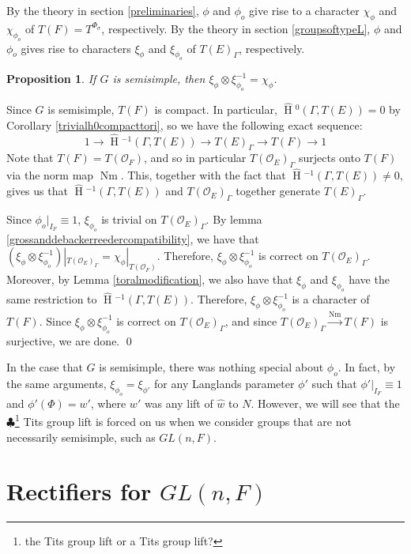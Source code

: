 \documentclass[11pt]{amsart}
\theoremstyle{plain}
\newtheorem{proposition}[theorem]{Proposition}
\newcommand{\MAxxx}[1]{$\clubsuit$\footnote{#1}}
\newcommand{\HT}[1]{\hat{\HH}{}^{#1}}
\theoremstyle{definition}
\DeclareMathOperator{\HH}{H}
\DeclareMathOperator{\Nm}{Nm}
\begin{document}
By the theory in section \ref{preliminaries}, $\phi$ and $\phi_o$ give
rise to a character $\chi_{\phi}$ and $\chi_{\phi_o}$ of
$T(F) = T^{\Phi_{\sigma}}$, respectively.  By the theory in section
\ref{groupsoftypeL}, $\phi$ and $\phi_o$ gives rise to characters
$\xi_{\phi}$ and $\xi_{\phi_o}$ of $T(E)_{\Gamma}$, respectively.

\begin{proposition}
If $G$ is semisimple, then $\xi_{\phi} \otimes \xi_{\phi_o}^{-1} = \chi_{\phi}$.
\end{proposition}

\proof
Since $G$ is semisimple, $T(F)$ is compact.  In particular,
$\HT{0}(\Gamma, T(E)) = 0$ by Corollary \ref{trivialh0compacttori}, 
so we have the following exact sequence:
$$1 \rightarrow \HT{-1}(\Gamma, T(E)) \rightarrow T(E)_{\Gamma} \rightarrow T(F) \rightarrow 1$$
Note that $T(F) = T(\mathcal{O}_F)$, and so in particular
$T(\mathcal{O}_E)_{\Gamma}$ surjects onto $T(F)$ via the norm map
$\Nm$.  This, together with the fact that $\HT{-1}(\Gamma, T(E)) \neq 0$,
gives us that $\HT{-1}(\Gamma,T(E))$ and
$T(\mathcal{O}_E)_{\Gamma}$ together generate $T(E)_{\Gamma}$.

Since $\phi_o|_{I_F} \equiv 1$, $\xi_{\phi_o}$ is trivial on
$T(\mathcal{O}_E)_{\Gamma}$.  By lemma
\ref{grossanddebackerreedercompatibility}, we have that
$(\xi_{\phi} \otimes \xi_{\phi_o}^{-1})|_{T(\mathcal{O}_E)_{\Gamma}} = \chi_{\phi}|_{T(\mathcal{O}_F)}$.
Therefore, $\xi_{\phi} \otimes \xi_{\phi_o}^{-1}$ is correct on
$T(\mathcal{O}_E)_{\Gamma}$.  Moreover, by Lemma
\ref{toralmodification}, we also have that $\xi_{\phi}$ and $\xi_{\phi_o}$ have
the same restriction to $\HT{-1}(\Gamma, T(E))$.  Therefore,
$\xi_{\phi} \otimes \xi_{\phi_o}^{-1}$ is a character of $T(F)$.  Since
$\xi_{\phi} \otimes \xi_{\phi_o}^{-1}$ is correct on $T(\mathcal{O}_E)_{\Gamma}$, and
since $T(\mathcal{O}_E)_{\Gamma} \xrightarrow{\Nm} T(F)$ is surjective,
we are done.
\qed

In the case that $G$ is semisimple, there was nothing special about
$\phi_o$.  In fact, by the same arguments, $\xi_{\phi_o} = \xi_{\phi'}$
for any Langlands parameter $\phi'$ such that $\phi'|_{I_F} \equiv 1$
and $\phi'(\Phi) = w'$, where $w'$ was any lift of $\hat{w}$ to $N$.
However, we will see that the \MAxxx{the Tits group lift or a Tits group
 lift?} Tits group lift is forced on us when we
consider groups that are not necessarily semisimple, such as $GL(n,F)$.

\section{Rectifiers for $GL(n,F)$}\label{GL(n)}
\end{document}
